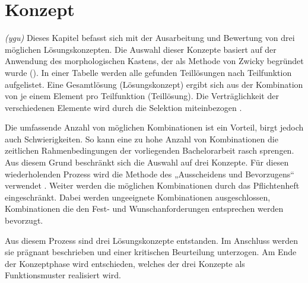 \newpage
\section{Konzept}
\label{konzept}
\textit{(ygu)} Dieses Kapitel befasst sich mit der Ausarbeitung und Bewertung von drei möglichen Lösungskonzepten. Die Auswahl dieser Konzepte basiert auf der Anwendung des morphologischen Kastens, der als Methode von Zwicky begründet wurde ().   In einer Tabelle werden alle gefunden Teillösungen nach Teilfunktion aufgelistet. Eine Gesamtlösung (Lösungskonzept) ergibt sich aus der Kombination von je einem Element pro Teilfunktion (Teillösung). Die Verträglichkeit der verschiedenen Elemente wird durch die Selektion miteinbezogen \cite{naefe}.
\newline

Die umfassende Anzahl von möglichen Kombinationen ist ein Vorteil, birgt jedoch auch Schwierigkeiten. So kann eine zu hohe Anzahl von Kombinationen die zeitlichen Rahmenbedingungen der vorliegenden Bachelorarbeit rasch sprengen. Aus diesem Grund beschränkt sich die Auswahl auf drei Konzepte. Für diesen wiederholenden Prozess wird die Methode des „Ausscheidens und Bevorzugens“ verwendet \cite{naefe}. Weiter werden die möglichen Kombinationen durch das Pflichtenheft eingeschränkt. Dabei werden ungeeignete Kombinationen ausgeschlossen, Kombinationen die den Fest- und Wunschanforderungen entsprechen werden bevorzugt.
\newline

Aus diesem Prozess sind drei Lösungskonzepte entstanden. Im Anschluss werden sie prägnant beschrieben und einer kritischen Beurteilung unterzogen. Am Ende der Konzeptphase wird entschieden, welches der drei Konzepte als Funktionsmuster realisiert wird.
